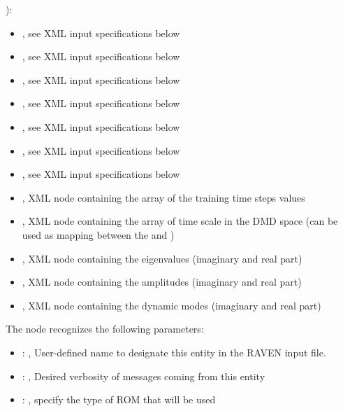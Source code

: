   ):     \begin{itemize}       \item {}, see XML input
  specifications below       \item {}, see XML input specifications below
  \item {}, see XML input specifications below       \item {}, see XML input
  specifications below       \item {}, see XML input specifications below
  \item {}, see XML input specifications below       \item {},
  see XML input specifications below       \item {}, XML node containing the array
  of the training time steps values       \item {}, XML node containing the
  array of time scale in the DMD space (can be used as mapping       between the
   and )       \item {}, XML node containing
  the eigenvalues (imaginary and real part)       \item {}, XML node containing
  the amplitudes (imaginary and real part)       \item {}, XML node containing the
  dynamic modes (imaginary and real part)     \end{itemize}

  The  node recognizes the following parameters:
    \begin{itemize}
      \item {}: , 
        User-defined name to designate this entity in the RAVEN input file.
      \item {}: , 
        Desired verbosity of messages coming from this entity
      \item {}: , 
        specify the type of ROM that will be used
  \end{itemize}

